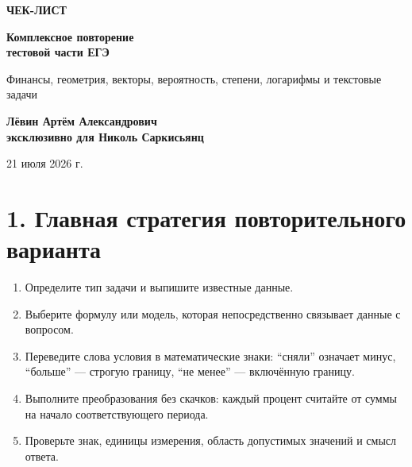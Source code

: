 \documentclass[a4paper,12pt]{article}
\renewcommand{\today}{21 июля 2026 г.}
\begin{document}
\begin{titlepage}
\centering
\vspace*{2.1cm}
{\color{accent}\Large\bfseries ЧЕК-ЛИСТ\par}
\vspace{0.45cm}
{\color{darkaccent}\fontsize{29}{34}\selectfont\bfseries Комплексное повторение\\тестовой части ЕГЭ\par}
\vspace{0.8cm}
{\large Финансы, геометрия, векторы, вероятность, степени, логарифмы и текстовые задачи\par}
\vfill
{\Large\bfseries Лёвин Артём Александрович\\[0.2cm]эксклюзивно для Николь Саркисьянц\par}
\vspace{0.8cm}
{\large \today\par}
\vfill
{}
\end{titlepage}

\section*{1. Главная стратегия повторительного варианта}
\begin{keybox}
\begin{enumerate}
\item Определите тип задачи и выпишите известные данные.
\item Выберите формулу или модель, которая непосредственно связывает данные с вопросом.
\item Переведите слова условия в математические знаки: ``сняли'' означает минус, ``больше'' --- строгую границу, ``не менее'' --- включённую границу.
\item Выполните преобразования без скачков: каждый процент считайте от суммы на начало соответствующего периода.
\item Проверьте знак, единицы измерения, область допустимых значений и смысл ответа.
\end{enumerate}
\end{keybox}
\end{document}
